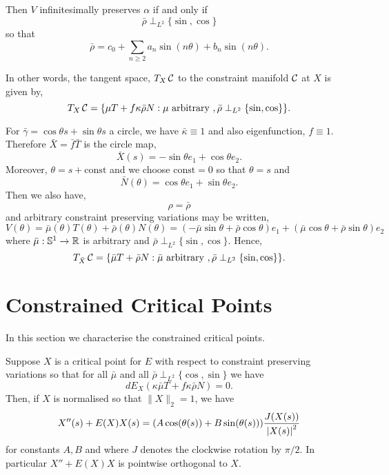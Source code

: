 \documentclass[12pt]{article}
\begin{document}
Then \(V\) infinitesimally preserves \(\alpha\) if and only if
\[
\bar{\rho} \perp_{L^2} \{\sin, \cos\}
\]
so that
\[
\bar{\rho} = c_0 + \sum_{n\geq 2} a_n \sin(n \theta) + b_n \sin(n \theta).
\]

In other words, the tangent space, \(T_X \operatorname{\mathcal{C}}\) to the constraint manifold \(\operatorname{\mathcal{C}}\) at \(X\) is given by,
\[
T_X \operatorname{\mathcal{C}} = \{\mu T + f\kappa\bar{\rho} N : \mu \text{ arbitrary }, \bar{\rho} \perp_{L^2} \{\sin, \cos\}\}.
\]

For \(\bar{\gamma} = \cos\theta s + \sin \theta s\) a circle, we have \(\bar{\kappa} \equiv 1\) and also eigenfunction, \(f \equiv 1\). Therefore \(\bar{X} = \bar{f} \bar{T}\) is the circle map,
\[
\bar{X}(s) = -\sin\theta e_1 + \cos\theta e_2.
\]
Moreover, \(\theta = s + \text{const}\) and we choose \(\text{const} = 0\) so that \(\theta = s\) and
\[
\bar{N}(\theta) = \cos\theta e_1 + \sin\theta e_2.
\]
Then we also have,
\[
\rho = \bar{\rho}
\]
and arbitrary constraint preserving variations may be written,
\[
V(\theta) = \bar{\mu}(\theta) T(\theta) + \bar{\rho}(\theta) N(\theta) = (- \bar{\mu}\sin\theta + \bar{\rho} \cos\theta) e_1 + (\bar{\mu}\cos\theta + \bar{\rho}\sin\theta) e_2
\]
where \(\bar{\mu} : \operatorname{\mathbb{S}^1} \to \operatorname{\mathbb{R}}\) is arbitrary and \(\bar{\rho} \perp_{L^2} \{\sin, \cos\}\). Hence,
\[
T_{\bar{X}} \operatorname{\mathcal{C}} = \{\bar{\mu} T + \bar{\rho} N : \bar{\mu} \text{ arbitrary }, \bar{\rho} \perp_{L^2} \{\sin, \cos\}\}.
\]

\section{Constrained Critical Points}

In this section we characterise the constrained critical points.

\begin{thm}
Suppose \(X\) is a critical point for \(E\) with respect to constraint preserving variations so that for all \(\bar{\mu}\) and all \(\bar{\rho} \perp_{L^2} \{\cos, \sin\}\) we have
\[
dE_X(\kappa\bar{\mu} T + f\kappa \bar{\rho} N) = 0.
\]
Then, if \(X\) is normalised so that \(\|X\|_2 = 1\), we have
\[
X''(s) + E(X) X(s) = (A \cos(\theta(s)) + B \sin(\theta(s))) \frac{J(X(s))}{\left|{X(s)}\right|^2}
\]
for constants \(A, B\) and where \(J\) denotes the clockwise rotation by \(\pi/2\). In particular \(X'' + E(X) X\) is pointwise orthogonal to \(X\).
\end{thm}
\end{document}
